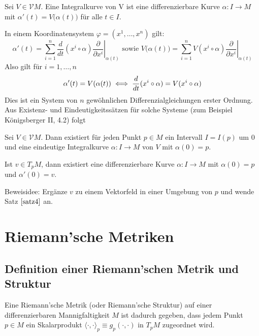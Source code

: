 \documentclass[a4paper,twoside,DIV15,BCOR12mm]{scrbook}
\newcommand{\VM}{\mathcal V M}
\begin{document}
Sei $V\in \VM $. Eine Integralkurve von V ist eine differenzierbare Kurve $\alpha: I\to M$ mit $\alpha'(t) = V\big(\alpha(t)\big)$ für alle $t\in I$.

In einem Koordinatensystem $\varphi=(x^1,\ldots,x^n)$ gilt:
\[
\alpha'(t) = \sum_{i=1}^n \frac d{dt}(x^i\circ \alpha) \left.\frac\partial{\partial x^i}\right|_{\alpha(t)}
\text{ sowie }
V\big(\alpha(t)\big) = \sum_{i=1}^n V(x^i\circ \alpha) \left.\frac\partial{\partial x^i}\right|_{\alpha(t)}
\]
Also gilt für $i=1,\ldots,n$
\[
\alpha'(t) = V(\alpha(t)) \iff \frac d{dt}(x^i\circ \alpha) = V(x^i\circ\alpha)
\]
Dies ist ein System von $n$ gewöhnlichen Differenzialgleichungen erster Ordnung. Aus Existenz- und Eindeutigkeitssätzen für solche Systeme (zum Beispiel Königsberger II, 4.2) folgt

\begin{satz}
Sei $V\in \VM $. Dann existiert für jeden Punkt $p\in M$ ein Intervall $I=I(p)$ um 0 und eine eindeutige Integralkurve $\alpha : I \to M$ von $V$ mit $\alpha(0) = p$.
\label{satz4}
\end{satz}

\begin{korrolar}
Ist $v\in T_pM$, dann existiert eine differenzierbare Kurve $\alpha: I\to M$ mit $\alpha (0)=p$ und $\alpha'(0)=v$.
\end{korrolar}
Beweisidee: Ergänze $v$ zu einem Vektorfeld in einer Umgebung von $p$ und wende Satz $\ref{satz4}$ an.

\chapter{Riemann’sche Metriken}

\section{Definition einer Riemann’schen Metrik und Struktur}
\newcommand{\asp}{\langle\cdot,\cdot\rangle} %
\newcommand{\ksp}[2]{\langle#1,#2\rangle} %
\newcommand{\lsp}[2]{\left\langle#1,#2\right\rangle} %
\newcommand{\aasp}{\langle\langle\cdot,\cdot\rangle\rangle} %

Eine Riemann’sche Metrik (oder Riemann’sche Struktur) auf einer differenzierbaren Mannigfaltigkeit $M$ ist dadurch gegeben, dass jedem Punkt $p\in M$ ein Skalarprodukt $\asp_p \equiv g_p(\cdot,\cdot)$ in $T_pM$ zugeordnet wird.
\end{document}

